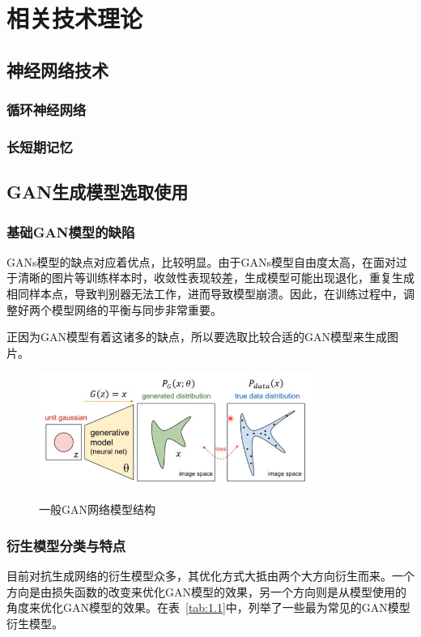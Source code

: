 
\chapter{相关技术理论}

\section{神经网络技术}

\subsection{循环神经网络}

\subsection{长短期记忆}

\section{GAN生成模型选取使用}
\subsection{基础GAN模型的缺陷}
GANs模型的缺点对应着优点，比较明显。由于GANs模型自由度太高，在面对过于清晰的图片等训练样本时，收敛性表现较差，生成模型可能出现退化，重复生成相同样本点，导致判别器无法工作，进而导致模型崩溃。因此，在训练过程中，调整好两个模型网络的平衡与同步非常重要。

正因为GAN模型有着这诸多的缺点，所以要选取比较合适的GAN模型来生成图片。

\begin{figure}[b]
    \centering
    \includegraphics[width=0.8\textwidth]
    {figures/ganprograss.jpeg}\\
    \caption{一般GAN网络模型结构}
    \label{fig:GAN}
  \end{figure}

\subsection{衍生模型分类与特点}
目前对抗生成网络的衍生模型众多，其优化方式大抵由两个大方向衍生而来。一个方向是由损失函数的改变来优化GAN模型的效果，另一个方向则是从模型使用的角度来优化GAN模型的效果。在表~\ref{tab:1.1}中，列举了一些最为常见的GAN模型衍生模型。

